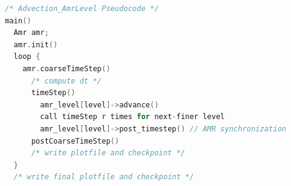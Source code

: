 \begin{lstlisting}[language=cpp]
/* Advection_AmrLevel Pseudocode */
main()
  Amr amr;
  amr.init()
  loop { 
    amr.coarseTimeStep()
      /* compute dt */
      timeStep()
        amr_level[level]->advance()
        call timeStep r times for next-finer level
        amr_level[level]->post_timestep() // AMR synchronization
      postCoarseTimeStep()
      /* write plotfile and checkpoint */
  }
  /* write final plotfile and checkpoint */
\end{lstlisting}
